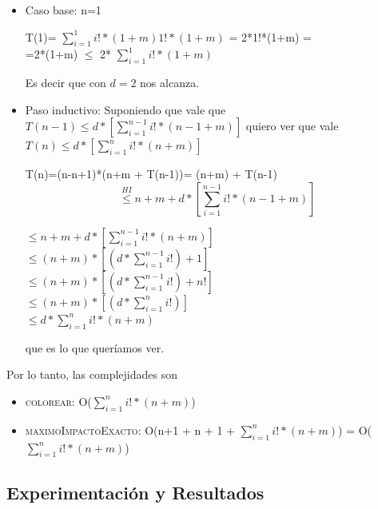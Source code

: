 \begin{itemize}
	\item Caso base: n=1 \\

\begin{center}
T(1)= $\sum_{i=1}^{1} i! * (1+m)  1! * (1+m) $ = 2*1!*(1+m) =\\
=2*(1+m) $\leq$ 2*  $\sum_{i=1}^{1} i! * (1+m)$ 
\end{center}

Es decir que con $d=2$ nos alcanza.

\item Paso inductivo: Suponiendo que vale que $T(n-1) \leq d * [\sum_{i=1}^{n-1} i! * (n-1+m)] $ quiero ver que vale $T(n) \leq d * [\sum_{i=1}^{n} i! * (n+m)] $ 

\begin{center}
T(n)=(n-n+1)*(n+m + T(n-1))= (n+m) + T(n-1)\\

$$\stackrel{HI}{\leq} n+m + d * [\sum_{i=1}^{n-1} i! * (n-1+m)] $$

$\leq n+m + d * [\sum_{i=1}^{n-1} i! * (n+m)] $ \\

$\leq (n+m) *[ (d* \sum_{i=1}^{n-1} i!) + 1] $ \\

$\leq (n+m) *[ (d* \sum_{i=1}^{n-1} i!) + n!]$ \\

$\leq (n+m) *[ (d* \sum_{i=1}^{n} i!)] $\\

$\leq  d* \sum_{i=1}^{n} i!*(n+m)$\\

\end{center}

\indent que es lo que queríamos ver.\\
\end{itemize}



Por lo tanto, las complejidades son

\begin{itemize}
	\item \textsc{colorear}: O($\sum_{i=1}^{n} i! * (n+m) $)
	\item \textsc{maximoImpactoExacto}: O(n+1 + n + 1 + $\sum_{i=1}^{n} i! * (n+m) $) = O($\sum_{i=1}^{n} i! * (n+m) $)
\end{itemize}

\subsection{Experimentación y Resultados}

